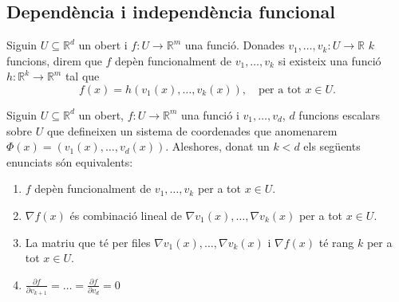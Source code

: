 \documentclass[../Apunts.tex]{subfiles}
\begin{document}
	\subsection{Dependència i independència funcional}
	\begin{definition}
		\label{def:dependència funcional}
		Siguin \(U\subseteq\mathbb{R}^{d}\) un obert i \(f\colon U\to\mathbb{R}^{m}\) una funció. Donades \(v_{1},\dots,v_{k}\colon U\to\mathbb{R}\) \(k\) funcions, direm que \(f\) depèn funcionalment de \(v_{1},\dots,v_{k}\) si existeix una funció \(h\colon\mathbb{R}^{k}\to\mathbb{R}^{m}\) tal que
		\[f(x)=h(v_{1}(x),\dots,v_{k}(x)),\quad\text{per a tot }x\in U.\]
	\end{definition}
	\begin{proposition}\label{prop:dependència funcional 4 punts}
		Siguin \(U\subseteq\mathbb{R}^{d}\) un obert, \(f\colon U\to\mathbb{R}^{m}\) una funció i \(v_{1},\dots,v_{d}\), \(d\) funcions escalars sobre \(U\) que defineixen un sistema de coordenades que anomenarem \(\Phi(x)=(v_{1}(x),\dots,v_{d}(x))\). Aleshores, donat un \(k<d\) els següents enunciats són equivalents:
		\begin{enumerate}
			\item\label{enum:dependència funcional 4 punts 1} \(f\) depèn funcionalment de \(v_{1},\dots,v_{k}\) per a tot \(x\in U\).
			\item\label{enum:dependència funcional 4 punts 2} \(\nabla f(x)\) és combinació lineal de \(\nabla v_{1}(x),\dots,\nabla v_{k}(x)\) per a tot \(x\in U\).
			\item\label{enum:dependència funcional 4 punts 3} La matriu que té per files \(\nabla v_{1}(x),\dots,\nabla v_{k}(x)\) i \(\nabla f(x)\) té rang \(k\) per a tot \(x\in U\).
			\item\label{enum:dependència funcional 4 punts 4} \(\frac{\partial f}{\partial v_{k+1}}=\dots=\frac{\partial f}{\partial v_{d}}=0\)
		\end{enumerate}

\end{proposition}
\end{document}
